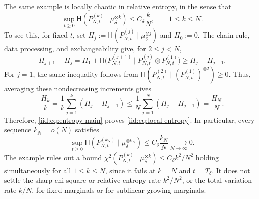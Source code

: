 \documentclass[11pt,reqno]{amsart}
\numberwithin{equation}{section}
\theoremstyle{plain}
\theoremstyle{remark}
\newcommand{\Hr}{\mathsf H}\newcommand{\dd}{\,\mathrm d}
\begin{document}
\begin{remark}\label{iid:rem:local}
The same example is locally chaotic in relative entropy, in the sense that
\begin{equation}\label{iid:eq:local-entropy}
 \sup_{t\ge0}\Hr(P_{N,t}^{(k)}\mid\mu_\delta^{\otimes k})
 \le C_\delta\frac{k}{N},\qquad 1\le k\le N.
\end{equation}
To see this, for fixed $t$, set $H_j:=\Hr(P_{N,t}^{(j)}\mid\mu_\delta^{\otimes j})$ and $H_0:=0$. The chain rule, data processing, and exchangeability give, for $2\le j<N$,
\begin{equation}\label{iid:eq:entropy-increments}
 H_{j+1}-H_j=H_1+\Hr\bigl(P_{N,t}^{(j+1)}\mid P_{N,t}^{(j)}\otimes P_{N,t}^{(1)}\bigr)\ge H_j-H_{j-1}.
\end{equation}
For $j=1$, the same inequality follows from $\Hr(P_{N,t}^{(2)}\mid(P_{N,t}^{(1)})^{\otimes2})\ge0$. Thus, averaging these nondecreasing increments gives
\begin{equation}\label{iid:eq:marginal-entropy-averages}
 \frac{H_k}{k}=\frac1k\sum_{j=1}^k(H_j-H_{j-1})
 \le\frac1N\sum_{j=1}^N(H_j-H_{j-1})=\frac{H_N}{N}.
\end{equation}
Therefore, \eqref{iid:eq:entropy-main} proves \eqref{iid:eq:local-entropy}. In particular, every sequence $k_N=o(N)$ satisfies
\begin{equation}\label{iid:eq:mesoscopic-entropy-limit}
 \sup_{t\ge0}\Hr(P_{N,t}^{(k_N)}\mid\mu_\delta^{\otimes k_N})
 \le C_\delta\frac{k_N}{N}\xrightarrow[N\to\infty]{}0.
\end{equation}
The example rules out a bound $\chi^2(P_{N,t}^{(k)}\mid\mu_\delta^{\otimes k})\le C_\delta k^2/N^2$ holding simultaneously for all $1\le k\le N$, since it fails at $k=N$ and $t=T_\delta$. It does not settle the sharp chi-square or relative-entropy rate $k^2/N^2$, or the total-variation rate $k/N$, for fixed marginals or for sublinear growing marginals.

\end{remark}


\par\endgroup
\end{document}
